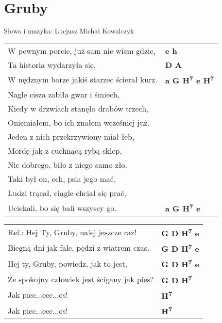 \section{Gruby}

Słowa i muzyka: Lucjusz Michał Kowalczyk \\

\vspace{2em}
\begin{tabular}{@{}p{9cm}@{}l@{}}
W pewnym porcie, już sam nie wiem gdzie, & \bfseries  e h \\
Ta historia wydarzyła się, & \bfseries  D A \\
W nędznym barze jakiś starzec ścierał kurz. & \bfseries  a G H\textsuperscript{7} e H\textsuperscript{7} \\
Nagle cisza zabiła gwar i śmiech, \\
Kiedy w drzwiach stanęło drabów trzech, \\
Oniemiałem, bo ich znałem wcześniej już. \\
Jeden z nich przekrzywiony miał łeb, \\
Mordę jak z cuchnącą rybą sklep, \\
Nic dobrego, biło z niego samo zło. \\
Taki był on, ech, psia jego mać, \\
Ludzi trącał, ciągle chciał się prać, \\
Uciekali, bo się bali wszyscy go. & \bfseries  a G H\textsuperscript{7} e \\
\end{tabular}

\vspace{1em}
\begin{tabular}{@{}p{9cm}@{}l@{}}
Ref.: Hej Ty, Gruby, nalej jeszcze raz! & \bfseries  G D H\textsuperscript{7} e \\
Biegną dni jak fale, pędzi z wiatrem czas. & \bfseries  G D H\textsuperscript{7} e \\
Hej ty, Gruby, powiedz, jak to jest, & \bfseries G D H\textsuperscript{7} e \\
Że spokojny człowiek jest ścigany jak pies? & \bfseries  G D H\textsuperscript{7} \\
Jak piee...eee...es! & \bfseries H\textsuperscript{7} \\
Jak piee...eee...es! & \bfseries  H\textsuperscript{7} \\
\end{tabular}

